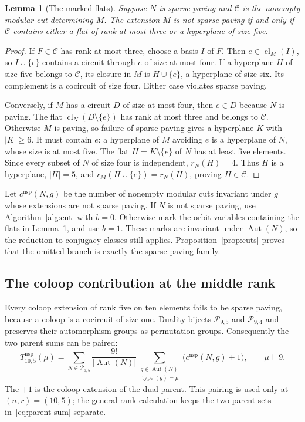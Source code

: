 \documentclass[11pt]{article}
\newtheorem{lemma}[theorem]{Lemma}
\theoremstyle{definition}
\DeclareMathOperator{\Aut}{Aut}
\DeclareMathOperator{\cl}{cl}
\DeclareMathOperator{\type}{type}
\newcommand{\nsp}{\mathrm{nsp}}
\newcommand{\Part}{\mathcal P}
\begin{document}
\begin{lemma}[The marked flats]\label{lem:marked}
Suppose $N$ is sparse paving and $\mathcal C$ is the nonempty modular cut
determining $M$.
The extension $M$ is not sparse paving if and only if $\mathcal C$ contains
either a flat of rank at most three or a hyperplane of size five.
\end{lemma}
\begin{proof}
If $F\in\mathcal C$ has rank at most three, choose a basis $I$ of $F$.
Then $e\in\cl_M(I)$, so $I\cup\{e\}$ contains a circuit through $e$
of size at most four. If a hyperplane $H$ of size five belongs to
$\mathcal C$, its closure in $M$ is $H\cup\{e\}$, a hyperplane of size six.
Its complement is a cocircuit of size four. Either case
violates sparse paving.

Conversely, if $M$ has a circuit $D$ of size at most four, then $e\in D$
because $N$ is paving. The flat $\cl_N(D\setminus\{e\})$ has rank at
most three and belongs to $\mathcal C$. Otherwise $M$ is paving, so failure
of sparse paving gives a hyperplane $K$ with $|K|\ge6$. It must contain
$e$: a hyperplane of $M$ avoiding $e$ is a hyperplane of $N$, whose size
is at most five. The flat $H=K\setminus\{e\}$ of $N$ has at least five
elements. Since every subset of $N$ of size four is independent,
$r_N(H)=4$. Thus $H$ is a hyperplane, $|H|=5$, and
$r_M(H\cup\{e\})=r_N(H)$, proving $H\in\mathcal C$.
\end{proof}

Let $c^{\nsp}(N,g)$ be the number of nonempty modular cuts invariant under
$g$ whose extensions are not sparse paving. If $N$ is not sparse paving, use
Algorithm~\ref{alg:cut} with $b=0$. Otherwise mark the orbit variables
containing the flats in Lemma~\ref{lem:marked}, and use $b=1$. These marks
are invariant under $\Aut(N)$, so the reduction to conjugacy classes still
applies. Proposition~\ref{prop:cuts} proves that the omitted branch is
exactly the sparse paving family.

\subsection{The coloop contribution at the middle rank}

Every coloop extension of rank five on ten elements fails to be sparse
paving, because a coloop is a cocircuit of size one. Duality bijects
$\Part_{9,5}$ and $\Part_{9,4}$ and preserves their automorphism groups
as permutation groups. Consequently the two parent sums can be paired:
\begin{equation}\label{eq:nsp-sum}
T^{\nsp}_{10,5}(\mu)=
\sum_{N\in\Part_{9,5}}\frac{9!}{|\Aut(N)|}
 \sum_{\substack{g\in\Aut(N)\\\type(g)=\mu}}
       \bigl(c^{\nsp}(N,g)+1\bigr),\qquad \mu\vdash9.
\end{equation}
The $+1$ is the coloop extension of the dual parent. This pairing is used
only at $(n,r)=(10,5)$; the general rank calculation keeps the two parent
sets in~\eqref{eq:parent-sum} separate.
\end{document}
